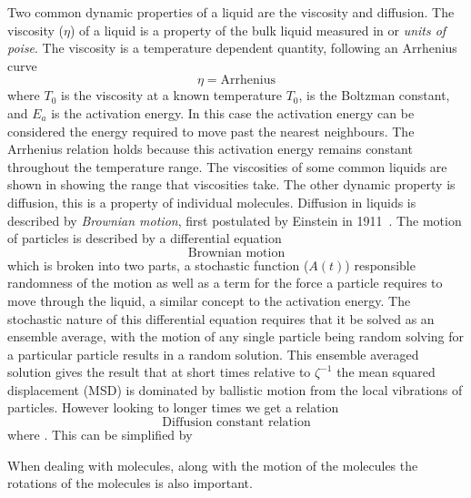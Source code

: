 \begin{figure}
    \caption{}
    \label{fig:radial distribution}
\end{figure}

Two common dynamic properties of a liquid are the viscosity and diffusion. The viscosity ($\eta$) of a liquid is a property of the bulk liquid measured in \si{\poise} or \emph{units of poise}. The viscosity is a temperature dependent quantity, following an Arrhenius curve
\begin{equation}
	\eta = \text{Arrhenius}
\end{equation}
where $T_0$ is the viscosity at a known temperature $T_0$, \KB is the Boltzman constant, and $E_a$ is the activation energy. In this case the activation energy can be considered the energy required to move past the nearest neighbours. The Arrhenius relation holds because this activation energy remains constant throughout the temperature range. The viscosities of some common liquids are shown in \tabref{} showing the range that viscosities take. The other dynamic property is diffusion, this is a property of individual molecules. Diffusion in liquids is described by \emph{Brownian motion}, first postulated by Einstein in 1911~\tocheck. The motion of particles is described by a differential equation 
\begin{equation}
	\text{Brownian motion}
\end{equation}
which is broken into two parts, a stochastic function ($A(t)$) responsible randomness of the motion as well as a term for the force a particle requires to move through the liquid, a similar concept to the activation energy. The stochastic nature of this differential equation requires that it be solved as an ensemble average, with the motion of any single particle being random solving for a particular particle results in a random solution. This ensemble averaged solution gives the result that at short times relative to $\zeta^{-1}$ the mean squared displacement (MSD) is dominated by ballistic motion from the local vibrations of particles. However looking to longer times we get a relation
\begin{equation}
	\text{Diffusion constant relation}
\end{equation}
where . This can be simplified by 



When dealing with molecules, along with the motion of the molecules the rotations of the molecules is also important. 



